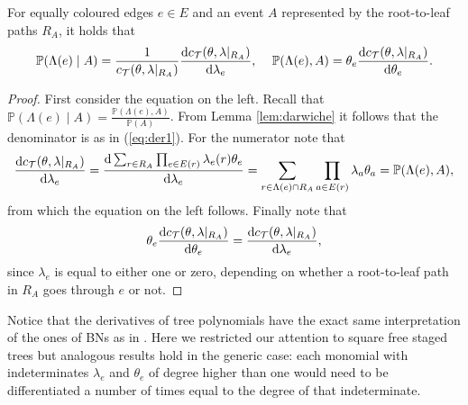 {\begin{proposition}\label{prop:darwiche}
For equally coloured edges $e\in E$ and an event $A$ represented by the root-to-leaf paths $R_A$, it holds that
\begin{equation}
\label{eq:der1}
\mathbb{P}(\Lambda(e)\;|\;A)=\frac{1}{c_\mathcal{T}(\theta,\lambda|_{R_A})}\frac{\dr c_\mathcal{T}(\theta,\lambda|_{R_A})}{\dr \lambda_e},~\;\;\;
\mathbb{P}(\Lambda(e),A)=\theta_e\frac{\dr c_\mathcal{T}(\theta,\lambda|_{R_A})}{\dr \theta_e}.
\end{equation}
\end{proposition}
\begin{proof}
First consider the equation on the left. Recall that $\mathbb{P}(\Lambda(e)\;|\;A)=\frac{\mathbb{P}(\Lambda(e),A)}{\mathbb{P}(A)}$. From Lemma \ref{lem:darwiche} it follows that the denominator is as in (\ref{eq:der1}). For the numerator note that 
\[
\frac{\textnormal{d} c_\mathcal{T}(\theta,\lambda|_{R_A})}{\textnormal{d} \lambda_e}=\frac{\textnormal{d} \sum_{r\in R_A}\prod_{ e\in E(r)}\lambda_e(r)\theta_e}{\textnormal{d} \lambda_e}=\sum_{r\in\Lambda(e)\cap R_A}\prod_{a\in E(r)}\lambda_a\theta_a=\mathbb{P}(\Lambda(e),A),
\]
from which the equation on the left follows. Finally note that 
\[
\theta_e\frac{\textnormal{d} c_\mathcal{T}(\theta,\lambda|_{R_A})}{\textnormal{d} \theta_e}=\frac{\textnormal{d} c_\mathcal{T}(\theta,\lambda|_{R_A})}{\textnormal{d} \lambda_e},
\]
since $\lambda_e$ is equal to either one or zero, depending on whether a root-to-leaf path in $R_A$ goes through $e$ or not.  
\end{proof}

 Notice that the derivatives of tree polynomials have the exact same interpretation of the ones of BNs as in \cite{Darwiche2003}. Here we restricted our attention to square free staged trees but analogous results hold in the generic case: each monomial with indeterminates $\lambda_e$ and $\theta_e$ of degree higher than one would need to be differentiated a number of times equal to the degree of that indeterminate.

}
